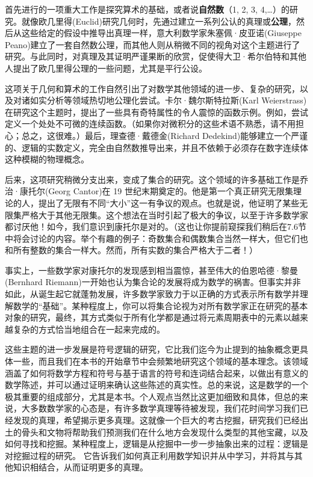 首先进行的一项重大工作是探究算术的基础，或者说\textbf{自然数}（1, 2, 3, 4,…）的研究。就像欧几里得(Euclid)研究几何时，先通过建立一系列公认的真理或\textbf{公理}，然后从这些给定的假设中推导出真理一样，意大利数学家朱塞佩·皮亚诺(Giuseppe Peano)建立了一套自然数公理，而其他人则从稍微不同的视角对这个主题进行了研究。与此同时，对真理及其证明严谨果断的欣赏，促使得大卫·希尔伯特和其他人提出了欧几里得公理的一些问题，尤其是平行公设。

这项关于几何和算术的工作自然引出了对数学其他领域的进一步、复杂的研究，以及对诸如实分析等领域热切地公理化尝试。卡尔·魏尔斯特拉斯(Karl Weierstrass)在研究这个主题时，提出了一些具有奇特属性的令人震惊的函数示例。例如，尝试定义一个处处不可微的连续函数。（如果你对微积分的这些术语不熟悉，请不用担心；总之，这很难。）最后，理查德·戴德金(Richard Dedekind)能够建立一个严谨的、逻辑的实数定义，完全由自然数推导出来，并且不依赖于必须存在数字连续体这种模糊的物理概念。

后来，这项研究稍微分支出来，变成了集合的研究。这个领域的许多基础工作是乔治·康托尔(Georg Cantor)在 19 世纪末期奠定的。他是第一个真正研究无限集理论的人，提出了无限有不同“大小”这一有争议的观点。也就是说，他证明了某些无限集严格大于其他无限集。这个想法在当时引起了极大的争议，以至于许多数学家都讨厌他！如今，我们意识到康托尔是对的。（这也让你提前窥探我们稍后在7.6节中将会讨论的内容。举个有趣的例子：奇数集合和偶数集合当然一样大，但它们也和所有整数的集合一样大。然而，所有实数的集合严格大于二者！）

事实上，一些数学家对康托尔的发现感到相当震惊，甚至伟大的伯恩哈德·黎曼(Bernhard Riemann)一开始也认为集合论的发展将成为数学的祸害。但事实并非如此，从诞生起它就蓬勃发展，许多数学家致力于以正确的方式表示所有数学并理解数学的“基础”。某种程度上，你可以将集合论视为对所有数学家正在研究的基本对象的研究，最终，其方式类似于所有化学都是通过将元素周期表中的元素以越来越复杂的方式恰当地组合在一起来完成的。

这些主题的进一步发展是符号逻辑的研究，它比我们迄今为止提到的抽象概念更具体一些，而且我们在本书的开始章节中会频繁地研究这个领域的基本理念。该领域涵盖了如何将数学方程和符号与基于语言的符号和连词结合起来，以做出有意义的数学陈述，并可以通过证明来确认这些陈述的真实性。总的来说，这是数学的一个极其重要的组成部分，尤其是本书。个人观点当然比这更加细致和具体，但总的来说，大多数数学家的心态是，有许多数学真理等待被发现，我们花时间学习我们已经发现的真理，希望揭示更多真理。这就像一个巨大的考古挖掘，研究我们已经出土的骨头和文物将帮助我们预测我们在什么地方会发现什么类型的其他宝藏，以及如何寻找和挖掘。某种程度上，逻辑是从挖掘中一步一步抽象出来的过程：逻辑是对挖掘过程的研究。 它告诉我们如何真正利用数学知识并从中学习，并将其与其他知识相结合，从而证明更多的真理。

